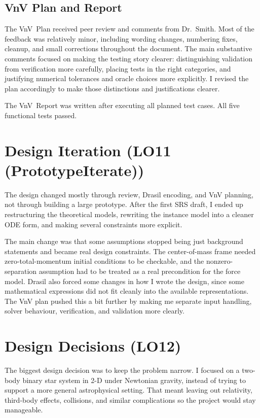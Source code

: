 \documentclass{article}
\begin{document}
\subsection{VnV Plan and Report}

The VnV~Plan received peer review and comments from Dr.~Smith. Most of the
feedback was relatively minor, including wording changes, numbering
fixes, cleanup, and small corrections throughout the document. The main
substantive comments focused on making the testing story clearer:
distinguishing validation from verification more carefully, placing
tests in the right categories, and justifying numerical tolerances and
oracle choices more explicitly. I revised the plan accordingly to make
those distinctions and justifications clearer.

The VnV~Report was written after executing all planned test cases. All
five functional tests passed.

\section{Design Iteration (LO11 (PrototypeIterate))}

The design changed mostly through review, Drasil encoding, and VnV
planning, not through building a large prototype. After the first SRS
draft, I ended up restructuring the theoretical models, rewriting the
instance model into a cleaner ODE form, and making several constraints
more explicit.

The main change was that some assumptions stopped being just background
statements and became real design constraints. The center-of-mass frame
needed zero-total-momentum initial conditions to be checkable, and the
nonzero-separation assumption had to be treated as a real precondition
for the force model. Drasil also forced some changes in how I wrote the
design, since some mathematical expressions did not fit cleanly into the
available representations. The VnV plan pushed this a bit further by
making me separate input handling, solver behaviour, verification, and
validation more clearly.

\section{Design Decisions (LO12)}

The biggest design decision was to keep the problem narrow. I focused on
a two-body binary star system in 2-D under Newtonian gravity, instead of
trying to support a more general astrophysical setting. That meant
leaving out relativity, third-body effects, collisions, and similar
complications so the project would stay manageable.
\end{document}
